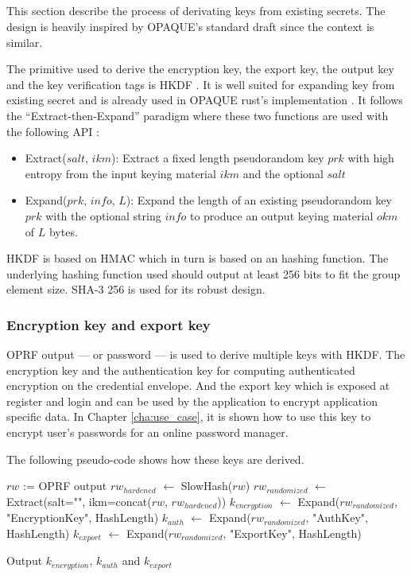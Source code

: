 \documentclass[../report.tex]{subfiles}
\begin{document}
\subsection{}

This section describe the process of derivating keys from existing secrets. The design is heavily inspired by OPAQUE's standard draft \cite{OPAQUE_Standard_Draft} since the context is similar.


The primitive used to derive the encryption key, the export key, the output key and the key verification tags is HKDF \cite{HKDF_RFC}. It is well suited for expanding key from existing secret and is already used in OPAQUE rust's implementation \cite{OPAQUE_KE_lib}. It follows the ``Extract-then-Expand'' paradigm where these two functions are used with the following API :

\begin{itemize}
 \item Extract($salt$, $ikm$): Extract a fixed length pseudorandom key $prk$ with high entropy from the input keying material $ikm$ and the optional $salt$
 \item Expand($prk$, $info$, $L$): Expand the length of an existing pseudorandom key $prk$ with the optional string $info$ to produce an output keying material $okm$ of $L$ bytes.
\end{itemize}

HKDF is based on HMAC which in turn is based on an hashing function. The underlying hashing function used should output at least 256 bits to fit the group element size. SHA-3 256 is used for its robust design.



\subsubsection{Encryption key and export key}
\label{sec:encryption_key}

OPRF output --- or password --- is used to derive multiple keys with HKDF. The encryption key and the authentication key for computing authenticated encryption on the credential envelope. And the export key which is exposed at register and login and can be used by the application to encrypt application specific data. In Chapter \ref{cha:use_case}, it is shown how to use this key to encrypt user's passwords for an online password manager.

The following pseudo-code shows how these keys are derived.
\begin{algorithmic}
\Require $rw$ := OPRF output
\State $rw_{hardened}$ $\gets$ SlowHash($rw$)
\State $rw_{randomized}$ $\gets$ Extract(salt="", ikm=concat($rw$, $rw_{hardened}$))
\State $k_{encryption}$ $\gets$ Expand($rw_{randomized}$, "EncryptionKey", HashLength)
\State $k_{auth}$ $\gets$ Expand($rw_{randomized}$, "AuthKey", HashLength)
\State $k_{export}$ $\gets$ Expand($rw_{randomized}$, "ExportKey", HashLength)

\State Output $k_{encryption}$, $k_{auth}$ and $k_{export}$
\end{algorithmic}
\end{document}
